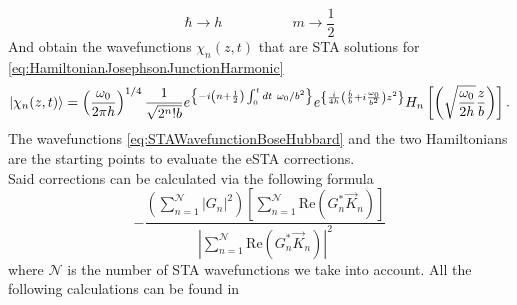 \begin{equation}
\label{eq:SubstitutionHarmonicOscillatorBoseHubbard}
\hbar \rightarrow h \hspace{5em} m \rightarrow \frac{1}{2}	
\end{equation}
And obtain the wavefunctions $ \chi_{n}(z,t) $ that are STA solutions for \cref{eq:HamiltonianJosephsonJunctionHarmonic}
 \begin{equation}
\label{eq:STAWavefunctionBoseHubbard}
	\ket{\chi_{n}(z,t)} = 
		\left(\frac{\omega_{0}}{ 2\pi h}\right)^{1/4} %
		\frac{1}{\sqrt{2^{n}!b} }e^{\left\{-i\left(n+\frac{1}{2}\right)\int_{0}^{t}dt~\omega_{0}/b^2\right\}} %
		e^{\left\{  \frac{i}{4h }\left(\frac{\dot{ b }}{b} + i\frac{\omega_{0}}{b^2}\right)z^2 \right\} } %
		H_{n}\left[\left(\sqrt{\frac{\omega_{0}}{2h }} \frac{z}{b}\right)\right] %
		.
\end{equation}
The wavefunctions \cref{eq:STAWavefunctionBoseHubbard} and the two Hamiltonians are the starting points to evaluate the eSTA corrections.\\
Said corrections can be calculated via the following formula
\begin{equation}
\label{eq:eSTAcorrections}
-\frac
{\left( \sum_{n=1}^{\mathcal{N}} |G_{n}|^2 \right)	\left[ \sum_{n=1}^{\mathcal{N}}\text{Re}(G_{n}^{*}\vec{K}_{n})\right]  }
	{\left|\sum_{n=1}^{\mathcal{N}}\text{Re}(G_{n}^{*}\vec{K}_{n})\right|^2 }	
\end{equation}
where $ \mathcal{N} $ is the number of STA wavefunctions we take into account.
All the following calculations can be found in \cite{1912.06057v1}
